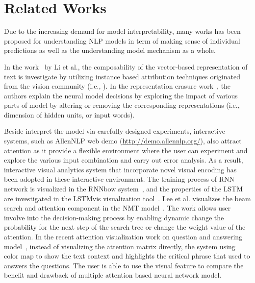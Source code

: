 \section{Related Works}
Due to the increasing demand for model interpretability, many works has been proposed for understanding NLP models in term of making sense of individual predictions as well as the understanding model mechanism as a whole. 

In the work~\cite{LiChenHovy2015} by Li et al., the composability of the vector-based representation of text is investigate by utilizing instance based attribution techniques originated from the vision community (i.e., \cite{SimonyanVedaldiZisserman2013, ZeilerFergus2014, YosinskiCluneNguyen2015, OlahMordvintsevSchubert2017}). 
%
In the representation erasure work~\cite{li2016understanding}, the authors explain the neural model decisions by exploring the impact of various parts of model by altering or removing the corresponding representations (i.e., dimension of hidden units, or input words). 

Beside interpret the model via carefully designed experiments, interactive systems, such as AllenNLP web demo (\url{http://demo.allennlp.org/}), also attract attention as it provide a flexible environment where the user can experiment and explore the various input combination and carry out error analysis.
%
As a result, interactive visual analytics system that incorporate novel visual encoding has been adopted in these interactive environment.
%
The training process of RNN network is visualized in the RNNbow system~\cite{CashmanPattersonMosca2017}, and the properties of the LSTM are investigated in the LSTMvis visualization tool~\cite{StrobeltGehrmannPfister2018}.
Lee et al. visualizes the beam search and attention component in the NMT model~\cite{lee2017interactive}. The work allows user involve into the decision-making process by enabling dynamic change the probability for the next step of the search tree or change the weight value of the attention.
In the recent attention visualization work on question and answering model~\cite{ruckle2017end}, 
instead of visualizing the attention matrix directly, the system using color map to show the text context and highlights the critical phrase that used to answers the questions. The user is able to use the visual feature to compare the benefit and drawback of multiple attention based neural network model.

